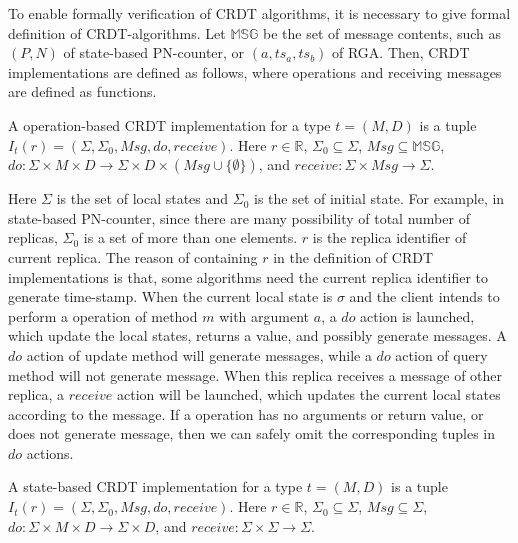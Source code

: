 To enable formally verification of CRDT algorithms, it is necessary to give formal definition of CRDT-algorithms. Let $\mathbb{MSG}$ be the set of message contents, such as $(P,N)$ of state-based PN-counter, or $(a,ts_a,ts_b)$ of RGA. Then, CRDT implementations are defined as follows, where operations and receiving messages are defined as functions.

\begin{definition}
\label{definition:operation-based CRDT implementations}
A operation-based CRDT implementation for a type $t = (M,D)$ is a tuple $I_t(r) = (\Sigma, \Sigma_0, \mathit{Msg}, \mathit{do},\mathit{receive})$. Here $r \in \mathbb{R}$, $\Sigma_0 \subseteq \Sigma$, $\mathit{Msg} \subseteq \mathbb{MSG}$, $\mathit{do}:\Sigma \times M \times D \rightarrow \Sigma \times D \times (\mathit{Msg} \cup \{ \emptyset \} )$, and $\mathit{receive}: \Sigma \times \mathit{Msg} \rightarrow \Sigma$.
\end{definition}

Here $\Sigma$ is the set of local states and $\Sigma_0$ is the set of initial state. For example, in state-based PN-counter, since there are many possibility of total number of replicas, $\Sigma_0$ is a set of more than one elements. $r$ is the replica identifier of current replica. The reason of containing $r$ in the definition of CRDT implementations is that, some algorithms need the current replica identifier to generate time-stamp. When the current local state is $\sigma$ and the client intends to perform a operation of method $m$ with argument $a$, a $\mathit{do}$ action is launched, which update the local states, returns a value, and possibly generate messages. A $\mathit{do}$ action of update method will generate messages, while a $\mathit{do}$ action of query method will not generate message. When this replica receives a message of other replica, a $\mathit{receive}$ action will be launched, which updates the current local states according to the message. If a operation has no arguments or return value, or does not generate message, then we can safely omit the corresponding tuples in $\mathit{do}$ actions.

\begin{definition}
\label{definition:state-based CRDT implementations}
A state-based CRDT implementation for a type $t = (M,D)$ is a tuple $I_t(r) = (\Sigma, \Sigma_0, \mathit{Msg}, \mathit{do},\mathit{receive})$. Here $r \in \mathbb{R}$, $\Sigma_0 \subseteq \Sigma$, $\mathit{Msg} \subseteq \Sigma$, $\mathit{do}:\Sigma \times M \times D \rightarrow \Sigma \times D$, and $\mathit{receive}: \Sigma \times \Sigma \rightarrow \Sigma$.
\end{definition}

